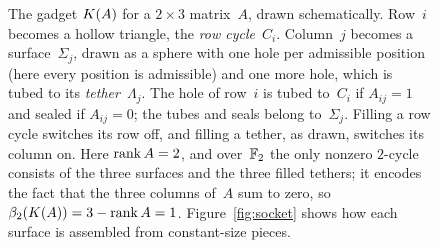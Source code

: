 \begin{figure}[t]
\caption{The gadget $K(A)$ for a $2\times3$ matrix~$A$, drawn schematically.
Row~$i$ becomes a hollow triangle, the \emph{row cycle}~$C_i$.
Column~$j$ becomes a surface~$\Sigma_j$, drawn as a sphere with one hole per admissible position (here every position is admissible) and one more hole, which is tubed to its \emph{tether}~$\Lambda_j$.
The hole of row~$i$ is tubed to~$C_i$ if $A_{ij}=1$ and sealed if $A_{ij}=0$; the tubes and seals belong to~$\Sigma_j$.
Filling a row cycle switches its row off, and filling a tether, as drawn, switches its column on.
Here $\operatorname{rank} A=2$, and over~$\mathbb{F}_2$ the only nonzero $2$-cycle consists of the three surfaces and the three filled tethers; it encodes the fact that the three columns of~$A$ sum to zero, so $\beta_2(K(A))=3-\operatorname{rank} A=1$.
Figure~\ref{fig:socket} shows how each surface is assembled from constant-size pieces.}
\label{fig:gadget}
\end{figure}
